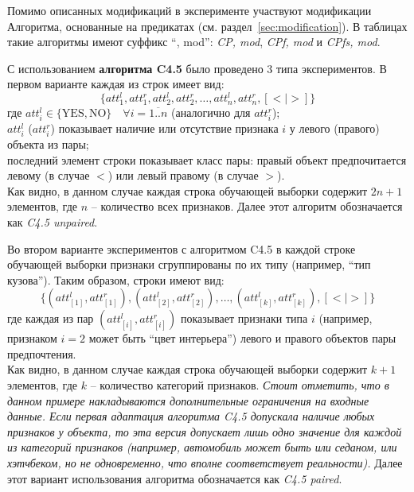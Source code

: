 	Помимо описанных модификаций в эксперименте участвуют модификации Алгоритма, основанные на предикатах (см. раздел~\ref{sec:modification}). В таблицах такие алгоритмы имеют суффикс ``, mod'': \emph{CP, mod}, \emph{CPf, mod} и \emph{CPfs, mod}.
	
	С использованием \textbf{алгоритма C4.5} было проведено 3 типа экспериментов. В первом варианте каждая из строк имеет вид: 
	\begin{equation}
	\label{eq:c4.5_unpaired_row}
	\{att_1^l, att_1^r, att_2^l, att_2^r, \dots, att_n^l, att_n^r, [< | >]\}
	\end{equation}
	где $att_i^l \in \{\text{YES}, \text{NO}\} \quad \forall i = \overline{1..n}$ (аналогично для $att_i^r$); \\
	$att_i^l$ ($att_i^r$) показывает наличие или отсутствие признака $i$ у левого (правого) объекта из пары; \\
	последний элемент строки показывает класс пары: правый объект предпочитается левому (в случае $<$) или левый правому (в случае $>$). \\
	Как видно, в данном случае каждая строка обучающей выборки содержит $2n + 1$ элементов, где $n$ – количество всех признаков. Далее этот алгоритм обозначается как \emph{C4.5 unpaired}.
	
	Во втором варианте экспериментов с алгоритмом C4.5 в каждой строке обучающей выборки признаки сгруппированы по их типу (например, ``тип кузова''). Таким образом, строки имеют вид:
	\begin{equation}
	\label{eq:c4.5_paired_row}
	\{(att_{[1]}^l, att_{[1]}^r), (att_{[2]}^l, att_{[2]}^r), \dots, (att_{[k]}^l, att_{[k]}^r), [< | >]\}
	\end{equation}
	где каждая из пар $(att_{[i]}^l, att_{[i]}^r)$ показывает признаки типа $i$ (например, признаком $i=2$ может быть ``цвет интерьера'') левого и правого объектов пары предпочтения. \\
	Как видно, в данном случае каждая строка обучающей выборки содержит $k + 1$ элементов, где $k$ – количество категорий признаков. \emph{Стоит отметить, что в данном примере накладываются дополнительные ограничения на входные данные. Если первая адаптация алгоритма C4.5 допускала наличие любых признаков у объекта, то эта версия допускает лишь одно значение для каждой из категорий признаков (например, автомобиль может быть или седаном, или хэтчбеком, но не одновременно, что вполне соответствует реальности).} Далее этот вариант использования алгоритма обозначается как \emph{C4.5 paired}.
	
